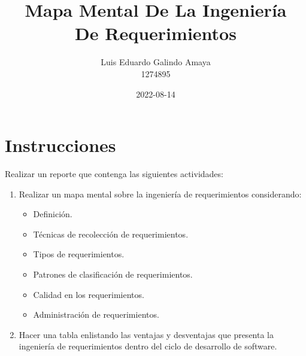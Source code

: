 \documentclass[12pt]{article}
\author{Luis Eduardo Galindo Amaya \\
1274895}
\date{2022-08-14}
\title{Mapa Mental De La Ingeniería \\
De Requerimientos}
\newcommand{\tagline}{Práctica 1}
\newcommand{\asignatura}{Ingeniería De Requerimientos}
\newcommand{\docente}{Claudia Gabriel Tona Castro}
\begin{document}

\setlength\parindent{0pt}   %
\setlength{\parskip}{0.75em}   %
\vspace*{0.75in}

\section{Instrucciones}
\label{sec:org5920ec2}
Realizar un reporte que contenga las siguientes actividades:

\begin{enumerate}
\item Realizar un mapa mental sobre la ingeniería de requerimientos considerando:
\begin{itemize}
\item Definición.
\item Técnicas de recolección de requerimientos.
\item Tipos de requerimientos.
\item Patrones de clasificación de requerimientos.
\item Calidad en los requerimientos.
\item Administración de requerimientos.
\end{itemize}

\item Hacer una tabla enlistando las ventajas y desventajas que presenta la ingeniería de requerimientos dentro del ciclo de desarrollo de software.
\end{enumerate}
\end{document}
